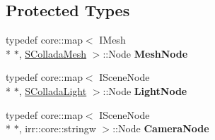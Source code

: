 \subsection*{Protected Types}
\begin{DoxyCompactItemize}
\item 
\hypertarget{classirr_1_1scene_1_1_c_collada_mesh_writer_aed6098cc1325764bbf16a0cdc9776f5a}{typedef core\-::map$<$ I\-Mesh \\*
$\ast$, \hyperlink{structirr_1_1scene_1_1_c_collada_mesh_writer_1_1_s_collada_mesh}{S\-Collada\-Mesh} $>$\-::Node {\bfseries Mesh\-Node}}\label{classirr_1_1scene_1_1_c_collada_mesh_writer_aed6098cc1325764bbf16a0cdc9776f5a}

\item 
\hypertarget{classirr_1_1scene_1_1_c_collada_mesh_writer_ab7ebf461a1613a98575e4b3aec57d67e}{typedef core\-::map$<$ I\-Scene\-Node \\*
$\ast$, \hyperlink{structirr_1_1scene_1_1_c_collada_mesh_writer_1_1_s_collada_light}{S\-Collada\-Light} $>$\-::Node {\bfseries Light\-Node}}\label{classirr_1_1scene_1_1_c_collada_mesh_writer_ab7ebf461a1613a98575e4b3aec57d67e}

\item 
\hypertarget{classirr_1_1scene_1_1_c_collada_mesh_writer_a591df4b1269ea0af6248b28207e03e4b}{typedef core\-::map$<$ I\-Scene\-Node \\*
$\ast$, irr\-::core\-::stringw $>$\-::Node {\bfseries Camera\-Node}}\label{classirr_1_1scene_1_1_c_collada_mesh_writer_a591df4b1269ea0af6248b28207e03e4b}

\end{DoxyCompactItemize}
